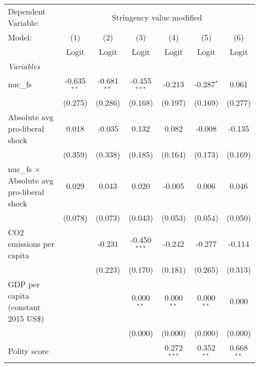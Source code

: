 
\begingroup
\centering
\begin{tabular}{lcccccc}
   \toprule
   Dependent Variable: & \multicolumn{6}{c}{Stringency value modified}\\
   Model:                                            & (1)           & (2)           & (3)            & (4)           & (5)          & (6)\\  
                                                     &  Logit        & Logit         & Logit          & Logit         & Logit        & Logit\\  
   \midrule
   \emph{Variables}\\
   nuc\_fs                                           & -0.635$^{**}$ & -0.681$^{**}$ & -0.455$^{***}$ & -0.213        & -0.287$^{*}$ & 0.061\\   
                                                     & (0.275)       & (0.286)       & (0.168)        & (0.197)       & (0.169)      & (0.277)\\   
   Absolute avg pro-liberal shock                    & 0.018         & -0.035        & 0.132          & 0.082         & -0.008       & -0.135\\   
                                                     & (0.359)       & (0.338)       & (0.185)        & (0.164)       & (0.173)      & (0.169)\\   
   nuc\_fs $\times$ Absolute avg pro-liberal shock   & 0.029         & 0.043         & 0.020          & -0.005        & 0.006        & 0.046\\   
                                                     & (0.078)       & (0.073)       & (0.043)        & (0.053)       & (0.054)      & (0.050)\\   
   CO2 emissions per capita                          &               & -0.231        & -0.450$^{***}$ & -0.242        & -0.277       & -0.114\\   
                                                     &               & (0.223)       & (0.170)        & (0.181)       & (0.265)      & (0.313)\\   
   GDP per capita (constant 2015 US\$)               &               &               & 0.000$^{**}$   & 0.000$^{**}$  & 0.000$^{**}$ & 0.000\\   
                                                     &               &               & (0.000)        & (0.000)       & (0.000)      & (0.000)\\   
   Polity score                                      &               &               &                & 0.272$^{***}$ & 0.352$^{**}$ & 0.668$^{**}$\\   

\end{tabular}
